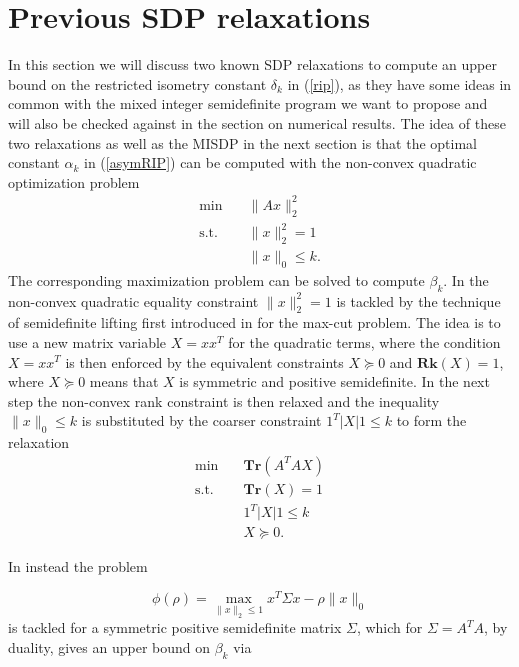 \documentclass{elsarticle}
\begin{document}
\section{Previous SDP relaxations}

In this section we will discuss two known SDP relaxations to compute an upper bound on the restricted isometry constant $\delta_k$ in (\ref{rip}), as they have some ideas in common with the mixed integer semidefinite program we want to 
propose and will also be checked against in the section on numerical results. The idea of these two relaxations as well as the MISDP in the next section is that the optimal constant $\alpha_k$ in (\ref{asymRIP}) can be computed
with the non-convex quadratic optimization problem
\begin{align}\label{QP}
 \text{min} \quad & \|Ax\|_2^2 \nonumber \\
 \text{s.t.} \quad & \|x\|_2^2 = 1 \tag{QP} \\
 & \|x\|_0 \leq k. \nonumber
\end{align}
The corresponding maximization problem can be solved to compute $\beta_k$. In \cite{Asp07} the non-convex quadratic equality constraint $\|x\|_2^2 = 1$ is tackled by the technique of semidefinite lifting first introduced in \cite{GW95} 
for the max-cut problem. The idea is to use a new matrix variable $X=xx^T$ for the quadratic terms, where the condition $X=xx^T$ is then enforced by the equivalent constraints $X \succeq 0$ and $\textbf{Rk}(X) = 1$, where 
$X \succeq 0$ means that $X$ is symmetric and positive semidefinite. In the next step the non-convex rank constraint is then relaxed and the inequality $\|x\|_0 \leq k$ is substituted by the coarser constraint $1^T|X|1 \leq k$ to form
the relaxation
\begin{align}\label{Asp07}
 \text{min} \quad & \textbf{Tr}(A^TAX) \nonumber \\
 \text{s.t.} \quad & \textbf{Tr}(X) = 1 \nonumber \\
 & 1^T|X|1 \leq k \tag{Asp07} \\
 & X \succeq 0. \nonumber
\end{align}

In \cite{Asp08} instead the problem

\begin{equation}\label{phi}
 \phi(\rho) = \max_{\|x\|_2 \leq 1} x^T \Sigma x - \rho \|x\|_0
\end{equation}
is tackled for a symmetric positive semidefinite matrix $\Sigma$, which for $\Sigma = A^TA$, by duality, gives an upper bound on $\beta_k$ via 
\end{document}
